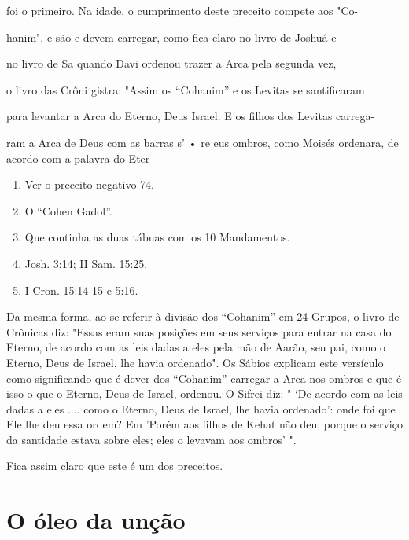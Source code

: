 foi o primeiro. Na idade, o cumprimento deste preceito compete aos "Co-

hanim", e são e devem carregar, como fica claro no livro de Joshuá e

no livro de Sa quando Davi ordenou trazer a Arca pela segunda vez,

o livro das Crôni gistra: "Assim os ``Cohanim'' e os Levitas se
santificaram

para levantar a Arca do Eterno, Deus Israel. E os filhos dos Levitas
carrega-

ram a Arca de Deus com as barras s' • re eus ombros, como Moisés
ordenara, de acordo com a palavra do Eter


\begin{enumerate}
\def\labelenumi{\arabic{enumi}.}
\setcounter{enumi}{52}
\item
 
 Ver o preceito negativo 74.
 
\item
 
 O ``Cohen Gadol''.
 
\item
 
 Que continha as duas tábuas com os 10 Mandamentos.
 
\item
 
 Josh. 3:14; II Sam. 15:25.
 
\item
 
 I Cron. 15:14-15 e 5:16.
 
\end{enumerate}

Da mesma forma, ao se referir à divisão dos ``Cohanim'' em 24 Gru­pos, o
livro de Crônicas diz: "Essas eram suas posições em seus serviços para
entrar na casa do Eterno, de acordo com as leis dadas a eles pela mão de
Aarão, seu pai, como o Eterno, Deus de Israel, lhe havia ordenado". Os
Sábios expli­cam este versículo como significando que é dever dos
``Cohanim'' carregar a Arca nos ombros e que é isso o que o Eterno, Deus
de Israel, ordenou. O Sifrei diz: " `De acordo com as leis dadas a eles
.... como o Eterno, Deus de Israel, lhe havia ordenado': onde foi que
Ele lhe deu essa ordem? Em 'Porém aos fi­lhos de Kehat não deu; porque o
serviço da santidade estava sobre eles; eles o levavam aos ombros' ".

Fica assim claro que este é um dos preceitos.

\section{O óleo da unção}

